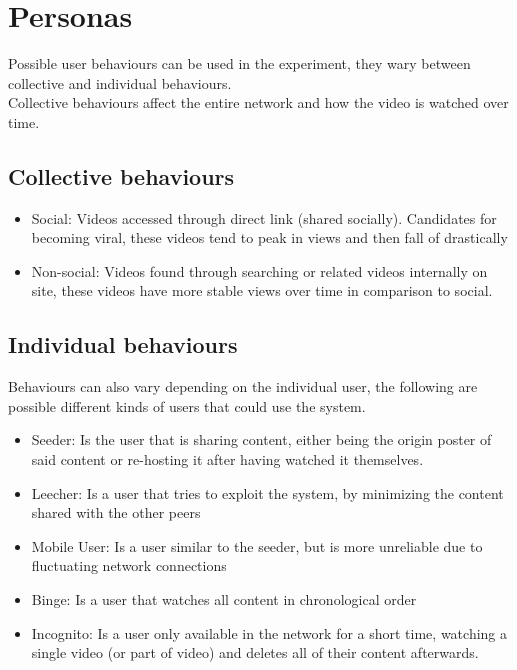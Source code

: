 \section{Personas}
Possible user behaviours can be used in the experiment, they wary between collective and individual behaviours.\\
Collective behaviours affect the entire network and how the video is watched over time.
\subsection{Collective behaviours}
\begin{itemize}
    \item Social:
    Videos accessed through direct link (shared socially). Candidates for becoming viral, these videos tend to peak in views and then fall of drastically
    \item Non-social:
    Videos found through searching or related videos internally on site, these videos have more stable views over time in comparison to social.
\end{itemize}

\subsection{Individual behaviours}
Behaviours can also vary depending on the individual user, the following are possible different kinds of users that could use the system.
\begin{itemize}
    \item Seeder:
    Is the user that is sharing content, either being the origin poster of said content or re-hosting it after having watched it themselves.
    \item Leecher:
    Is a user that tries to exploit the system, by minimizing the content shared with the other peers %
    \item Mobile User:
    Is a user similar to the seeder, but is more unreliable due to fluctuating network connections
    \item Binge:
    Is a user that watches all content in chronological order
    \item Incognito:
    Is a user only available in the network for a short time, watching a single video (or part of video) and deletes all of their content afterwards.
\end{itemize}

